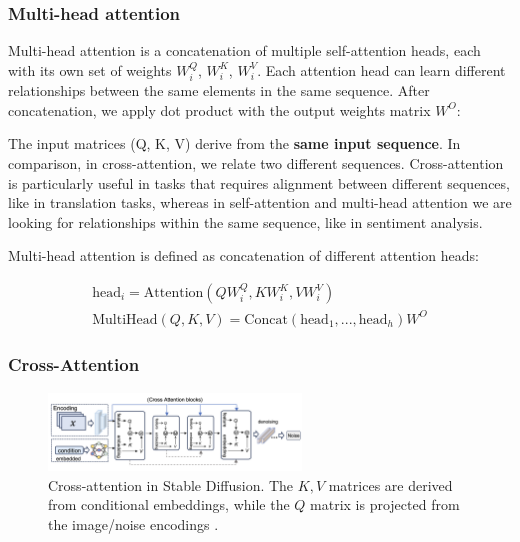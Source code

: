 \subsubsection{Multi-head attention}

Multi-head attention is a concatenation of multiple self-attention heads, each with its own set of weights $W_i^Q$, $W_i^K$, $W_i^V$. Each attention head can learn different relationships between the same elements in the same sequence. After concatenation, we apply dot product with the output weights matrix $W^O$:

The input matrices (Q, K, V) derive from the \textbf{same input sequence}. In comparison, in cross-attention, we relate two different sequences. Cross-attention is particularly useful in tasks that requires alignment between different sequences, like in translation tasks, whereas in self-attention and multi-head attention we are looking for relationships within the same sequence, like in sentiment analysis.

Multi-head attention is defined as concatenation of different attention heads:

\begin{equation}
    \begin{aligned}
        \text{head}_i = \text{Attention}(QW_i^Q, KW_i^K, VW_i^V)  \\
        \text{MultiHead}(Q, K, V) = \text{Concat}(\text{head}_1, ..., \text{head}_h)W^O
    \end{aligned}
\end{equation}














\subsubsection{Cross-Attention}

\begin{figure}[ht]
    \centering
    \includegraphics[width=0.6\textwidth]{images/diffusion_models/stable_diffusion/cross_attention.png}
    \caption{Cross-attention in Stable Diffusion. The $K,V$ matrices are derived from conditional embeddings, while the $Q$ matrix is projected from the image/noise encodings \cite{sun2024sora}.}
    \label{fig:cross_attention}
\end{figure}

